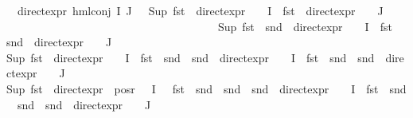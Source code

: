 \begin{isabellebody}
\ \ {\isachardoublequoteopen}direct{\isacharunderscore}{\kern0pt}expr\ {\isacharparenleft}{\kern0pt}hml{\isacharunderscore}{\kern0pt}conj\ I\ J\ {\isasymPhi}{\isacharparenright}{\kern0pt}\ {\isacharequal}{\kern0pt}\ {\isacharparenleft}{\kern0pt}Sup\ {\isacharparenleft}{\kern0pt}{\isacharparenleft}{\kern0pt}fst\ {\isasymcirc}\ direct{\isacharunderscore}{\kern0pt}expr\ {\isasymcirc}\ {\isasymPhi}{\isacharparenright}{\kern0pt}\ {\isacharbackquote}{\kern0pt}\ I\ {\isasymunion}\ {\isacharparenleft}{\kern0pt}fst\ {\isasymcirc}\ direct{\isacharunderscore}{\kern0pt}expr\ {\isasymcirc}\ {\isasymPhi}{\isacharparenright}{\kern0pt}\ {\isacharbackquote}{\kern0pt}\ J{\isacharparenright}{\kern0pt}{\isacharcomma}{\kern0pt}\ \isanewline
\ \ \ \ \ \ \ \ \ \ \ \ \ \ \ \ \ \ \ \ \ \ \ \ \ \ \ \ \ \ \ \ \ \ \ \ {}\ {\isacharplus}{\kern0pt}\ Sup\ {\isacharparenleft}{\kern0pt}{\isacharparenleft}{\kern0pt}fst\ {\isasymcirc}\ snd\ {\isasymcirc}\ direct{\isacharunderscore}{\kern0pt}expr\ {\isasymcirc}\ {\isasymPhi}{\isacharparenright}{\kern0pt}\ {\isacharbackquote}{\kern0pt}\ I\ {\isasymunion}\ {\isacharparenleft}{\kern0pt}fst\ {\isasymcirc}\ snd\ {\isasymcirc}\ direct{\isacharunderscore}{\kern0pt}expr\ {\isasymcirc}\ {\isasymPhi}{\isacharparenright}{\kern0pt}\ {\isacharbackquote}{\kern0pt}\ J{\isacharparenright}{\kern0pt}{\isacharcomma}{\kern0pt}\ \isanewline
{\isacharparenleft}{\kern0pt}Sup\ {\isacharparenleft}{\kern0pt}{\isacharparenleft}{\kern0pt}fst\ {\isasymcirc}\ direct{\isacharunderscore}{\kern0pt}expr\ {\isasymcirc}\ {\isasymPhi}{\isacharparenright}{\kern0pt}\ {\isacharbackquote}{\kern0pt}\ I\ {\isasymunion}\ {\isacharparenleft}{\kern0pt}fst\ {\isasymcirc}\ snd\ {\isasymcirc}\ snd\ {\isasymcirc}\ direct{\isacharunderscore}{\kern0pt}expr\ {\isasymcirc}\ {\isasymPhi}{\isacharparenright}{\kern0pt}\ {\isacharbackquote}{\kern0pt}\ I\ {\isasymunion}\ {\isacharparenleft}{\kern0pt}fst\ {\isasymcirc}\ snd\ {\isasymcirc}\ snd\ {\isasymcirc}\ direct{\isacharunderscore}{\kern0pt}expr\ {\isasymcirc}\ {\isasymPhi}{\isacharparenright}{\kern0pt}\ {\isacharbackquote}{\kern0pt}\ J{\isacharparenright}{\kern0pt}{\isacharparenright}{\kern0pt}{\isacharcomma}{\kern0pt}\isanewline
{\isacharparenleft}{\kern0pt}Sup\ {\isacharparenleft}{\kern0pt}{\isacharparenleft}{\kern0pt}{\isacharparenleft}{\kern0pt}fst\ {\isasymcirc}\ direct{\isacharunderscore}{\kern0pt}expr{\isacharparenright}{\kern0pt}\ {\isacharbackquote}{\kern0pt}\ {\isacharparenleft}{\kern0pt}pos{\isacharunderscore}{\kern0pt}r\ {\isacharparenleft}{\kern0pt}{\isasymPhi}\ {\isacharbackquote}{\kern0pt}\ I{\isacharparenright}{\kern0pt}{\isacharparenright}{\kern0pt}{\isacharparenright}{\kern0pt}\ \ {\isasymunion}\ {\isacharparenleft}{\kern0pt}fst\ {\isasymcirc}\ snd\ {\isasymcirc}\ snd\ {\isasymcirc}\ snd\ {\isasymcirc}\ direct{\isacharunderscore}{\kern0pt}expr\ {\isasymcirc}\ {\isasymPhi}{\isacharparenright}{\kern0pt}\ {\isacharbackquote}{\kern0pt}\ I\ {\isasymunion}\ {\isacharparenleft}{\kern0pt}fst\ {\isasymcirc}\ snd\ {\isasymcirc}\ snd\ {\isasymcirc}\ snd\ {\isasymcirc}\ direct{\isacharunderscore}{\kern0pt}expr\ {\isasymcirc}\ {\isasymPhi}{\isacharparenright}{\kern0pt}\ {\isacharbackquote}{\kern0pt}\ J{\isacharparenright}{\kern0pt}{\isacharparenright}{\kern0pt}{\isacharcomma}{\kern0pt}\ \ \isanewline

\end{isabellebody}
